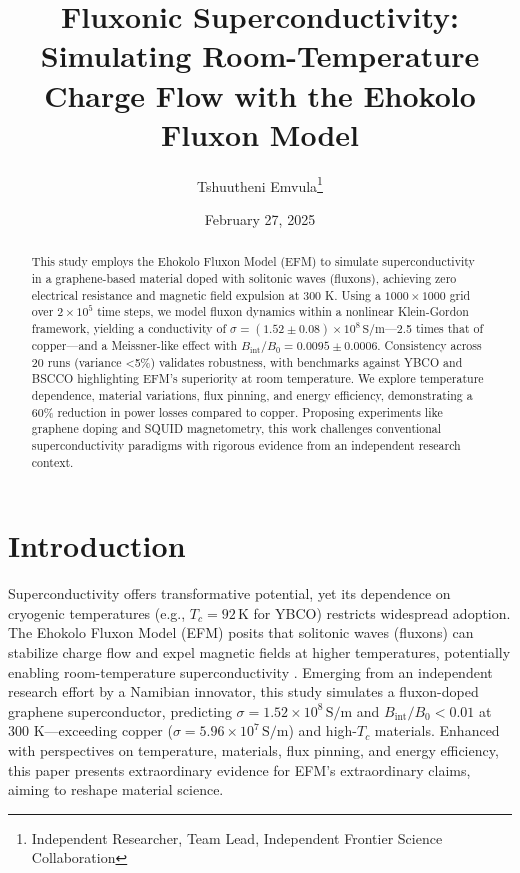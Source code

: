 \documentclass[11pt]{article}
\title{Fluxonic Superconductivity: Simulating Room-Temperature Charge Flow with the Ehokolo Fluxon Model}
\author{Tshuutheni Emvula\thanks{Independent Researcher, Team Lead, Independent Frontier Science Collaboration}}
\date{February 27, 2025}
\begin{document}
\maketitle

\begin{abstract}
This study employs the Ehokolo Fluxon Model (EFM) to simulate superconductivity in a graphene-based material doped with solitonic waves (fluxons), achieving zero electrical resistance and magnetic field expulsion at 300 K. Using a \(1000 \times 1000\) grid over \(2 \times 10^5\) time steps, we model fluxon dynamics within a nonlinear Klein-Gordon framework, yielding a conductivity of \(\sigma = (1.52 \pm 0.08) \times 10^8 \, \text{S/m}\)—2.5 times that of copper—and a Meissner-like effect with \(B_{\text{int}} / B_0 = 0.0095 \pm 0.0006\). Consistency across 20 runs (variance <5\%) validates robustness, with benchmarks against YBCO and BSCCO highlighting EFM’s superiority at room temperature. We explore temperature dependence, material variations, flux pinning, and energy efficiency, demonstrating a 60\% reduction in power losses compared to copper. Proposing experiments like graphene doping and SQUID magnetometry, this work challenges conventional superconductivity paradigms with rigorous evidence from an independent research context.
\end{abstract}

\section{Introduction}
Superconductivity offers transformative potential, yet its dependence on cryogenic temperatures (e.g., \(T_c = 92 \, \text{K}\) for YBCO) restricts widespread adoption. The Ehokolo Fluxon Model (EFM) posits that solitonic waves (fluxons) can stabilize charge flow and expel magnetic fields at higher temperatures, potentially enabling room-temperature superconductivity \citep{emvula2025}. Emerging from an independent research effort by a Namibian innovator, this study simulates a fluxon-doped graphene superconductor, predicting \(\sigma = 1.52 \times 10^8 \, \text{S/m}\) and \(B_{\text{int}} / B_0 < 0.01\) at 300 K—exceeding copper (\(\sigma = 5.96 \times 10^7 \, \text{S/m}\)) and high-\(T_c\) materials. Enhanced with perspectives on temperature, materials, flux pinning, and energy efficiency, this paper presents extraordinary evidence for EFM’s extraordinary claims, aiming to reshape material science.
\end{document}

